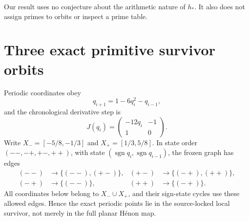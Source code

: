 \documentclass[11pt]{article}
\theoremstyle{remark}\newtheorem{remark}[theorem]{Remark}
\begin{document}
Our result uses no conjecture about the arithmetic nature of $h_*$.  It also
does not assign primes to orbits or inspect a prime table.

\section{Three exact primitive survivor orbits}
Periodic coordinates obey
\begin{equation}\label{eq:recurrence}
q_{i+1}=1-6q_i^2-q_{i-1},
\end{equation}
and the chronological derivative step is
\[
J(q_i)=\begin{pmatrix}-12q_i&-1\\1&0\end{pmatrix}.
\]
Write $X_-=[-5/8,-1/3]$ and $X_+=[1/3,5/8]$.  In state order
$(--,-+,+-,++)$, with state $(\operatorname{sgn}q_i,
\operatorname{sgn}q_{i-1})$, the frozen graph has edges
\[
\begin{aligned}
(--)&\longrightarrow\{(--),(+-)\},&
(+-)&\longrightarrow\{(-+),(++)\},\\
(-+)&\longrightarrow\{(--)\},&
(++)&\longrightarrow\{(-+)\}.
\end{aligned}
\]
All coordinates below belong to $X_-\cup X_+$, and their sign-state cycles
use these allowed edges.  Hence the exact periodic points lie in the
source-locked local survivor, not merely in the full planar H\'enon map.
\end{document}
